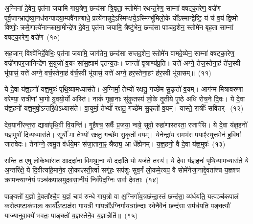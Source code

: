 अ॒ग्निना॑ दे॒वेन॒ पृत॑ना जयामि गाय॒त्रेण॒ छन्द॑सा त्रि॒वृता॒ स्तोमे॑न रथन्त॒रेण॒ साम्ना॑ वषट्का॒रेण॒ वज्रे॑ण पूर्व॒जान्भ्रातृ॑व्या॒नध॑रान्पादया॒म्यवै॑\-नान्बाधे॒ प्रत्ये॑नान्नुदे॒\-ऽस्मिन्क्षये॒\-ऽस्मिन्भू॑मिलो॒के यो᳚\-ऽस्मान्द्वेष्टि॒ यं च॑ व॒यं द्वि॒ष्मो विष्णोः॒ क्रमे॒णात्ये॑नान्क्रामा॒मीन्द्रे॑ण दे॒वेन॒ पृत॑ना जयामि॒ त्रैष्टु॑भेन॒ छन्द॑सा पञ्चद॒शेन॒ स्तोमे॑न बृह॒ता साम्ना॑ वषट्का॒रेण॒ वज्रे॑ण~(१०)\ip

सह॒जान् विश्वे॑भिर्दे॒वेभिः॒ पृत॑ना जयामि॒ जाग॑तेन॒ छन्द॑सा सप्तद॒शेन॒ स्तोमे॑न वामदे॒व्येन॒ साम्ना॑ वषट्का॒रेण॒ वज्रे॑णापर॒जानिन्द्रे॑ण स॒युजो॑ व॒यꣳ सा॑स॒ह्याम॑ पृतन्य॒तः। घ्नन्तो॑ वृ॒त्राण्य॑प्र॒ति। यत्ते॑ अग्ने॒ तेज॒स्तेना॒हं ते॑ज॒स्वी भू॑यासं॒ यत्ते॑ अग्ने॒ वर्च॒स्तेना॒हं व॑र्च॒स्वी भू॑यासं॒ यत्ते॑ अग्ने॒ हर॒स्तेना॒हꣳ ह॑र॒स्वी भू॑यासम्॥~(११)\ip

{}

ये दे॒वा य॑ज्ञ॒हनो॑ यज्ञ॒मुषः॑ पृथि॒व्यामध्यास॑ते। अ॒ग्निर्मा॒ तेभ्यो॑ रक्षतु॒ गच्छे॑म सु॒कृतो॑ व॒यम्। आग॑न्म मित्रावरुणा वरेण्या॒ रात्री॑णां भा॒गो यु॒वयो॒र्यो अस्ति॑। नाकं॑ गृह्णा॒नाः सु॑कृ॒तस्य॑ लो॒के तृ॒तीये॑ पृ॒ष्ठे अधि॑ रोच॒ने दि॒वः। ये दे॒वा य॑ज्ञ॒हनो॑ यज्ञ॒मुषो॒\-ऽन्तरि॒क्षे\-ऽध्यास॑ते। वा॒युर्मा॒ तेभ्यो॑ रक्षतु॒ गच्छे॑म सु॒कृतो॑ व॒यम्। यास्ते॒ रात्रीः᳚ \mbox{सवितर्-~(१२)\ip}

देव॒यानी॑रन्त॒रा द्यावा॑\-पृथि॒वी वि॒यन्ति॑। गृ॒हैश्च॒ सर्वैः᳚ प्र॒जया॒ न्वग्रे॒ सुवो॒ रुहा॑णास्तरता॒ रजाꣳ॑सि। ये दे॒वा य॑ज्ञ॒हनो॑ यज्ञ॒मुषो॑ दि॒व्यध्यास॑ते। सूर्यो॑ मा॒ तेभ्यो॑ रक्षतु॒ गच्छे॑म सु॒कृतो॑ व॒यम्। येनेन्द्रा॑य स॒मभ॑रः॒ पयाꣴ॑स्युत्त॒\-मेन॑ ह॒विषा॑ जातवेदः। तेना᳚ग्ने॒ त्वमु॒त व॑र्धये॒मꣳ स॑जा॒ताना॒ꣴ॒ श्रैष्ठ्य॒ आ धे᳚ह्येनम्। य॒ज्ञ॒हनो॒ वै दे॒वा य॑ज्ञ॒मुषः॑~(१३)\ip

सन्ति॒ त ए॒षु लो॒केष्वा॑सत आ॒ददा॑ना विमथ्ना॒ना यो ददा॑ति॒ यो यज॑ते॒ तस्य॑। ये दे॒वा य॑ज्ञ॒हनः॑ पृथि॒व्यामध्यास॑ते॒ ये अ॒न्तरि॑क्षे॒ ये दि॒वीत्या॑हे॒माने॒व लो॒काꣴस्ती॒र्त्वा सगृ॑हः॒ सप॑शुः सुव॒र्गं लो॒कमे॒त्यप॒ वै सोमे॑नेजा॒नाद्दे॒वता᳚श्च य॒ज्ञश्च॑ क्रामन्त्याग्ने॒यं पञ्च॑कपालमुदवसा॒नीयं॒ निर्व॑पेद॒ग्निः सर्वा॑ दे॒वताः॒~(१४)\ip

पाङ्क्तो॑ य॒ज्ञो दे॒वता᳚श्चै॒व य॒ज्ञं चाव॑ रुन्धे गाय॒त्रो वा अ॒ग्निर्गा॑य॒त्रछ॑न्दा॒स्तं छन्द॑सा॒ व्य॑र्धयति॒ यत्पञ्च॑कपालं क॒रोत्य॒ष्टाक॑पालः का॒र्यो᳚\-ऽष्टाक्ष॑रा गाय॒त्री गा॑य॒त्रो᳚\-ऽग्निर्गा॑य॒त्रछ॑न्दाः॒ स्वेनै॒वैनं॒ छन्द॑सा॒ सम॑र्धयति प॒ङ्क्त्यौ॑ याज्यानुवा॒क्ये॑ भवतः॒ पाङ्क्तो॑ य॒ज्ञस्तेनै॒व य॒ज्ञान्नैति॑॥~(१५)\ip

{\anuvakamend[{स॒वि॒त॒र्दे॒वा य॑ज्ञ॒मुषः॒ सर्वा॑ दे॒वता॒स्त्रिच॑त्वारिꣳशच्च}]}


